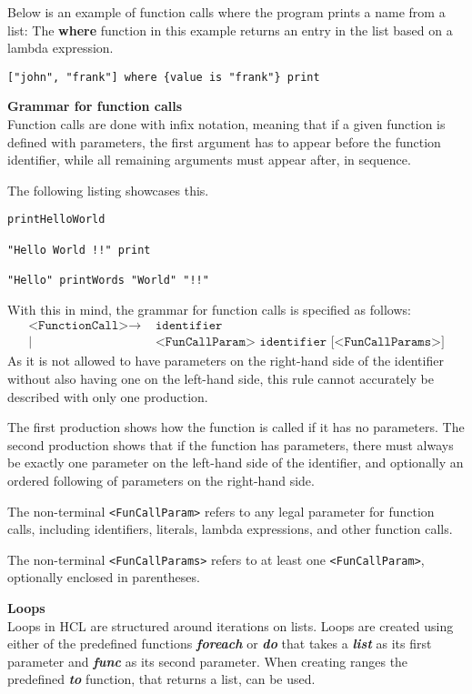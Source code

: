 Below is an example of function calls where the program prints a name from a list:
The \textbf{where} function in this example returns an entry in the list based on a lambda expression.
\begin{lstlisting}[language=HCL,label=lis:hclPrintnFromList,firstnumber=1]
["john", "frank"] where {value is "frank"} print
\end{lstlisting}

\textbf{Grammar for function calls}\\
Function calls are done with infix notation, meaning that if a given function is defined with parameters, the first argument has to appear before the function identifier, while all remaining arguments must appear after, in sequence.

The following listing showcases this.
\begin{lstlisting}[language=HCL,caption={Function call notation in HCL.
printHelloWolrd, print and printWords are example functions.
},firstnumber=1]
printHelloWorld

"Hello World !!" print

"Hello" printWords "World" "!!"
\end{lstlisting}

With this in mind, the grammar for function calls is specified as follows:
\begin{align*}
	\texttt{<FunctionCall>}\to & \texttt{ identifier}\\
	| & \texttt{ <FunCallParam> identifier [<FunCallParams>]}
\end{align*}
As it is not allowed to have parameters on the right-hand side of the identifier without also having one on the left-hand side, this rule cannot accurately be described with only one production.

The first production shows how the function is called if it has no parameters.
The second production shows that if the function has parameters, there must always be exactly one parameter on the left-hand side of the identifier, and optionally an ordered following of parameters on the right-hand side.

The non-terminal \texttt{<FunCallParam>} refers to any legal parameter for function calls, including identifiers, literals, lambda expressions, and other function calls.

The non-terminal \texttt{<FunCallParams>} refers to at least one \texttt{<FunCallParam>}, optionally enclosed in parentheses.

\textbf{Loops}\\
Loops in HCL are structured around iterations on lists.
Loops are created using either of the predefined functions \textbf{\textit{foreach}} or \textbf{\textit{do}} that takes a \textbf{\textit{list}} as its first parameter and \textbf{\textit{func}} as its second parameter.
When creating ranges the predefined \textbf{\textit{to}} function, that returns a list, can be used. 

